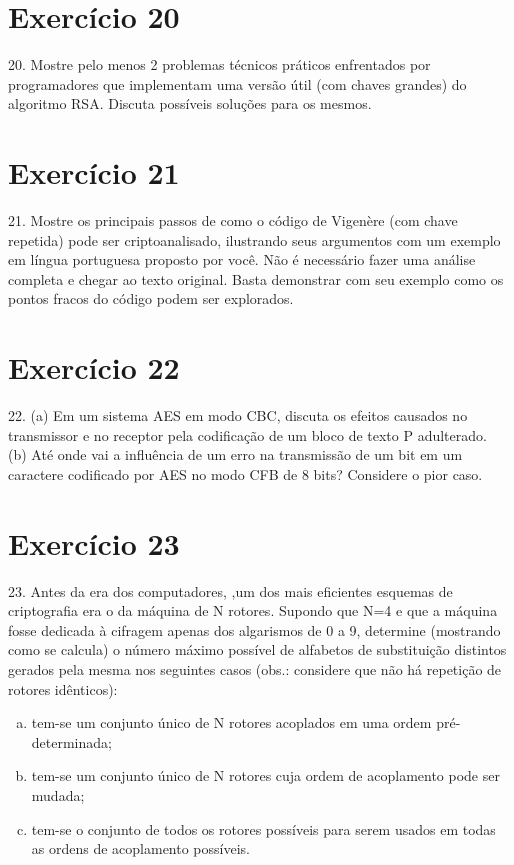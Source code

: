 \documentclass[10pt,a4paper]{article}
\begin{document}
\section*{Exercício 20}
20. Mostre pelo menos 2 problemas técnicos práticos enfrentados por programadores que implementam uma versão útil (com chaves grandes) do algoritmo RSA. Discuta possíveis soluções para os mesmos.\\
\section*{Exercício 21}
21. Mostre os principais passos de como o código de Vigenère (com chave repetida) pode ser criptoanalisado, ilustrando seus argumentos com um exemplo em língua portuguesa proposto por você. Não é necessário fazer uma análise completa e chegar ao texto original. Basta demonstrar com seu exemplo como os pontos fracos do código podem ser explorados.\\
\section*{Exercício 22}
22. (a) Em um sistema AES em modo CBC, discuta os efeitos causados no transmissor e no receptor pela codificação de um bloco de texto P adulterado.\\
(b) Até onde vai a influência de um erro na transmissão de um bit em um caractere codificado por AES no modo CFB de 8 bits? Considere o pior caso.\\
\section*{Exercício 23}
23. Antes da era dos computadores, ,um dos mais eficientes esquemas de criptografia era o da máquina de N rotores. Supondo que N=4 e que a máquina fosse dedicada à cifragem apenas dos algarismos de 0 a 9, determine (mostrando como se calcula) o número máximo possível de alfabetos de substituição distintos gerados pela mesma nos seguintes casos (obs.: considere que não há repetição de rotores idênticos):
\begin{enumerate}[(a)]
\item tem-se um conjunto único de N rotores acoplados em uma ordem pré-determinada;
\item tem-se um conjunto único de N rotores cuja ordem de acoplamento pode ser mudada;
\item tem-se o conjunto de todos os rotores possíveis para serem usados em todas as ordens de acoplamento possíveis.
\end{enumerate}
\end{document}
